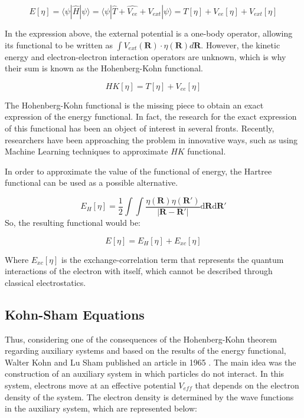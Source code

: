 \begin{equation}
  E[\eta] = \langle \psi | \hat{H} | \psi \rangle = \langle \psi | \hat{T} + \hat{V_{ee}} + V_{ext}  | \psi \rangle = T[\eta] + V_{ee}[\eta] + V_{ext}[\eta]
\end{equation}

In the expression above, the external potential is a one-body operator, allowing its functional to be written as $\int V_{ext}(\textbf{R}) \cdot \eta (\textbf{R}) d\textbf{R}$. However, the kinetic energy and electron-electron interaction operators are unknown, which is why their sum is known as the Hohenberg-Kohn functional.

\begin{equation}
    HK[\eta] = T[\eta] + V_{ee}[\eta]
\end{equation}

The Hohenberg-Kohn functional is the missing piece to obtain an exact expression of the energy functional. In fact, the research for the exact expression of this functional has been an object of interest in several  fronts. Recently, researchers have been approaching the problem in innovative ways, such as using Machine Learning techniques to approximate $HK$ functional\cite{PhysRevLett.125.076402}.

In order to approximate the value of the functional of energy, the Hartree functional can be used as a possible alternative.

\begin{equation}
E_{H}[\eta] = \frac{1}{2}\int\int \frac{\eta(\mathbf{\textbf{R}})\eta(\mathbf{\textbf{R}}')}{|\mathbf{\textbf{R}}-\mathbf{\textbf{R}}'|} \mathrm{d}\mathbf{\textbf{R}}\mathrm{d}\mathbf{\textbf{R}}'
\end{equation}
So, the resulting functional would be:

\begin{equation}
E[\eta] = E_{H}[\eta] + E_{xc}[\eta]
\end{equation}

Where $E_{xc}[\eta]$ is the exchange-correlation term that represents the quantum interactions of the electron with itself, which cannot be described through classical electrostatics.

\subsection{Kohn-Sham Equations}
Thus, considering one of the consequences of the Hohenberg-Kohn theorem regarding auxiliary systems and based on the results of the energy functional, Walter Kohn and Lu Sham published an article in 1965 \cite{PhysRev.140.A1133}. The main idea was the construction of an auxiliary system in which particles do not interact. In this system, electrons move at an effective potential $V_{eff}$ that depends on the electron density of the system. The electron density is determined by the wave functions in the auxiliary system, which are represented below:


